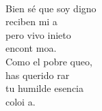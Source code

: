\documentclass[12pt]{article}
\begin{document}
\begin{multicols*}{2}
\begin{cancion}
\begin{chorus}
	\end{chorus}%
	\jump\\
	Bien sé que soy digno \\
	reciben mi a\\
	pero vivo inieto\\
	 encont  moa.\\
	Como el pobre queo, \\
	 has querido rar\\
	 tu humilde esencia \\
	 coloi a. \\
\end{cancion}%


\end{multicols*}
\end{document}
